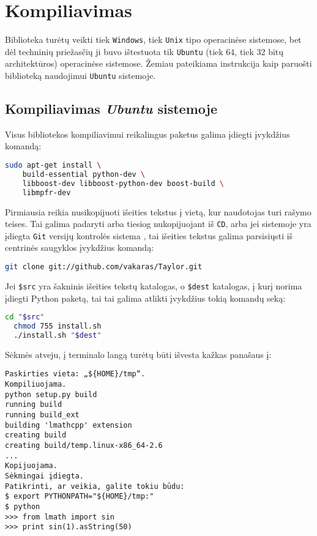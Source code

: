 \chapter{Kompiliavimas}

Biblioteka turėtų veikti tiek \verb|Windows|, tiek 
\verb|Unix| tipo operacinėse sistemose, bet dėl techninių priežasčių
ji buvo ištestuota tik \verb|Ubuntu| (tiek 64, tiek 32 bitų 
architektūros) operacinėse sistemose. Žemiau pateikiama instrukcija
kaip paruošti biblioteką naudojimui \verb|Ubuntu| sistemoje.

\section{Kompiliavimas \emph{Ubuntu} sistemoje}

Visus bibliotekos kompiliavimui reikalingus paketus galima įdiegti įvykdžius
komandą:
\begin{lstlisting}[language=bash]
  sudo apt-get install \
    build-essential python-dev \
    libboost-dev libboost-python-dev boost-build \
    libmpfr-dev
\end{lstlisting}

Pirmiausia reikia nusikopijuoti išeities tekstus į vietą, kur naudotojas
turi rašymo teises. Tai galima padaryti arba tiesiog nukopijuojant
iš \verb|CD|, arba jei sistemoje yra įdiegta \verb|Git| versijų kontrolės
sistema \cite{git}, tai išeities tekstus galima parsisiųsti iš centrinės
saugyklos įvykdžius komandą:

\begin{lstlisting}[language=bash]
  git clone git://github.com/vakaras/Taylor.git  
\end{lstlisting}

Jei \verb|$src| yra šakninis išeities tekstų katalogas, o \verb|$dest|
katalogas, į kurį norima įdiegti Python paketą, tai tai galima 
atlikti įvykdžius tokią komandų seką:

\begin{lstlisting}[language=bash]
  cd "$src"
  chmod 755 install.sh
  ./install.sh "$dest"
\end{lstlisting}

Sėkmės atveju, į terminalo langą turėtų būti išvesta kažkas panašaus į:
\begin{verbatim}
Paskirties vieta: „${HOME}/tmp“.
Kompiliuojama.
python setup.py build
running build
running build_ext
building 'lmathcpp' extension
creating build
creating build/temp.linux-x86_64-2.6
...
Kopijuojama.
Sėkmingai įdiegta.
Patikrinti, ar veikia, galite tokiu būdu:
$ export PYTHONPATH="${HOME}/tmp:"
$ python
>>> from lmath import sin
>>> print sin(1).asString(50)
\end{verbatim}

